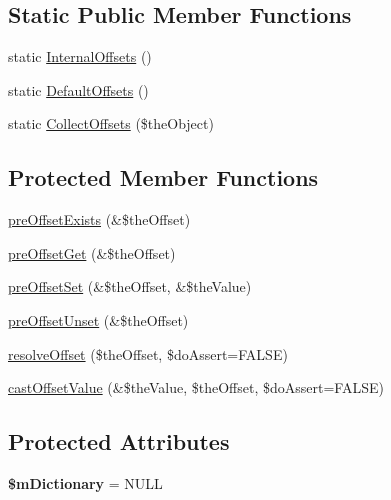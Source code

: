 \subsection*{Static Public Member Functions}
\begin{DoxyCompactItemize}
\item 
static \hyperlink{class_ontology_wrapper_1_1_ontology_object_a1ec71ca3fd7be57916082804c1a30124}{Internal\-Offsets} ()
\item 
static \hyperlink{class_ontology_wrapper_1_1_ontology_object_ac0f027cfe61e72b63ff5ec104e8b6221}{Default\-Offsets} ()
\item 
static \hyperlink{class_ontology_wrapper_1_1_ontology_object_a4779563a363ea7d5dcd399f014c23622}{Collect\-Offsets} (\$the\-Object)
\end{DoxyCompactItemize}
\subsection*{Protected Member Functions}
\begin{DoxyCompactItemize}
\item 
\hyperlink{class_ontology_wrapper_1_1_ontology_object_aa8827d96f0f76ffdebde8346e331699c}{pre\-Offset\-Exists} (\&\$the\-Offset)
\item 
\hyperlink{class_ontology_wrapper_1_1_ontology_object_ab00c85a26561bf83f4721fa0edab5764}{pre\-Offset\-Get} (\&\$the\-Offset)
\item 
\hyperlink{class_ontology_wrapper_1_1_ontology_object_aa7e9b36fdc00584a143e6c920b6d2c87}{pre\-Offset\-Set} (\&\$the\-Offset, \&\$the\-Value)
\item 
\hyperlink{class_ontology_wrapper_1_1_ontology_object_a4ff5501f4fb4cf9fa88dbf5b3f845a1c}{pre\-Offset\-Unset} (\&\$the\-Offset)
\item 
\hyperlink{class_ontology_wrapper_1_1_ontology_object_a2b3dac52af65a0008dc4a026ddaac36b}{resolve\-Offset} (\$the\-Offset, \$do\-Assert=F\-A\-L\-S\-E)
\item 
\hyperlink{class_ontology_wrapper_1_1_ontology_object_a46279a5fe37004d92c98383d3edf16f9}{cast\-Offset\-Value} (\&\$the\-Value, \$the\-Offset, \$do\-Assert=F\-A\-L\-S\-E)
\end{DoxyCompactItemize}
\subsection*{Protected Attributes}
\begin{DoxyCompactItemize}
\item 
\hypertarget{class_ontology_wrapper_1_1_ontology_object_ac57fd33455aec2a7726517d58178cb99}{{\bfseries \$m\-Dictionary} = N\-U\-L\-L}\label{class_ontology_wrapper_1_1_ontology_object_ac57fd33455aec2a7726517d58178cb99}

\end{DoxyCompactItemize}


